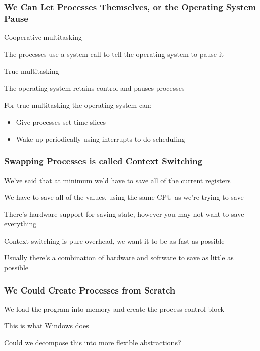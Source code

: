   \begin{frame}
    \frametitle{We Can Let Processes Themselves, or the Operating System Pause}
    
    Cooperative multitasking

    \hspace{2em} The processes use a system call to tell the operating system to
    pause it

    \vspace{2em}

    True multitasking

    \hspace{2em} The operating system retains control and pauses processes

    \vspace{4em}

    For true multitasking the operating system can:

    \begin{itemize}
      \item Give processes set time slices
      \item Wake up periodically using interrupts to do scheduling
    \end{itemize}
  \end{frame}

  \begin{frame}
    \frametitle{Swapping Processes is called Context Switching}

    We've said that at minimum we'd have to save all of the current registers

    \hspace{2em} We have to save all of the values, using the same CPU as we're
    trying to save

    \vspace{2em}

    There's hardware support for saving state, however you may not want to save
    everything

    \vspace{2em}

    Context switching is pure overhead, we want it to be as fast as possible


    \vspace{4em}

    Usually there's a combination of hardware and software to save as little as
    possible
  \end{frame}

  \begin{frame}
    \frametitle{We Could Create Processes from Scratch}

    We load the program into memory and create the process control block

    \vspace{2em}

    This is what Windows does

    \vspace{4em}

    Could we decompose this into more flexible abstractions?
  \end{frame}

